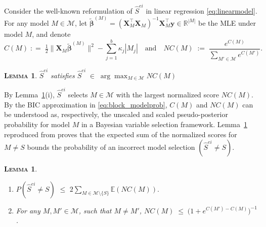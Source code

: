 \documentclass[
  12pt]{article}
\newcommand{\E}{\mathbb{E}}
\newcommand{\R}{\mathbb{R}}
\newcommand{\M}{\mathcal{M}}
\newcommand{\by}{\mathbf{y}}
\newcommand{\bbeta}{\boldsymbol{\beta}}
\newcommand{\bX}{\mathbf{X}}
\newtheorem{lem}[thm]{\textsc{Lemma}}
\begin{document}
Consider the well-known
reformulation of $\hat S^{ei}$ in linear regression \eqref{eq:linearmodel}.
For any model $M\in \M$, let $\tilde{\bbeta}^{(M)}= (\bX_{\!\!M}^\top \bX_{\!\!M})^{-1}\bX_{\!\!M}^\top\by \in \R^{|M|}$ be the MLE under model $M$, and denote
\begin{equation}\label{eq:CM}
    C(M)\;: =\;\tfrac{1}{2}\|\bX_M\tilde{\bbeta}^{(M)}\|^2-\sum_{j=1}^b\kappa_j |M_j|\quad\text{and}\quad NC(M)\;:=\;\frac{e^{C(M)}}{\underset{M' \in \M}{\sum} e^{C(M')}}.
\end{equation}
\begin{lem}\label{lem:useful-reformulation} 
$\hat{S}^{ei}$ satisfies $\hat{S}^{ei}\;\in\;\arg\max_{M\in \M} NC(M)$    
\end{lem}
By Lemma~\ref{lem:useful-reformulation}(i), $\hat{S}^{ei}$ selects
$M\in \M$ with the largest normalized score $NC(M)$. By the BIC approximation in \eqref{eq:block_modelprob}, $C(M)$ and $NC(M)$ can be understood as, respectively, the unscaled and scaled pseudo-posterior probability for model $M$ in a Bayesian variable selection framework. Lemma~\ref{lem:L0toL1convergence} reproduced from \cite{rossell2022concentration} proves that the expected sum of the normalized scores for $M\neq S$ bounds the probability of an incorrect model selection $(\hat{S}^{ei}\neq S)$. 
\begin{lem}\label{lem:L0toL1convergence}
\begin{enumerate}[label=(\roman*)]
\item 
$P(\hat{S}^{ei} \neq S) \,\,\leq \,\, 2 \sum_{M \in \M\setminus \{S\}} \E\left(NC(M)\right).$
\item  For any $M,M'\in\M$, such that $M\neq M'$, 
$NC(M)\;\leq \;\big(1+e^{C(M')-C(M)}\big)^{-1}$.
\end{enumerate}
\end{lem}
\end{document}
